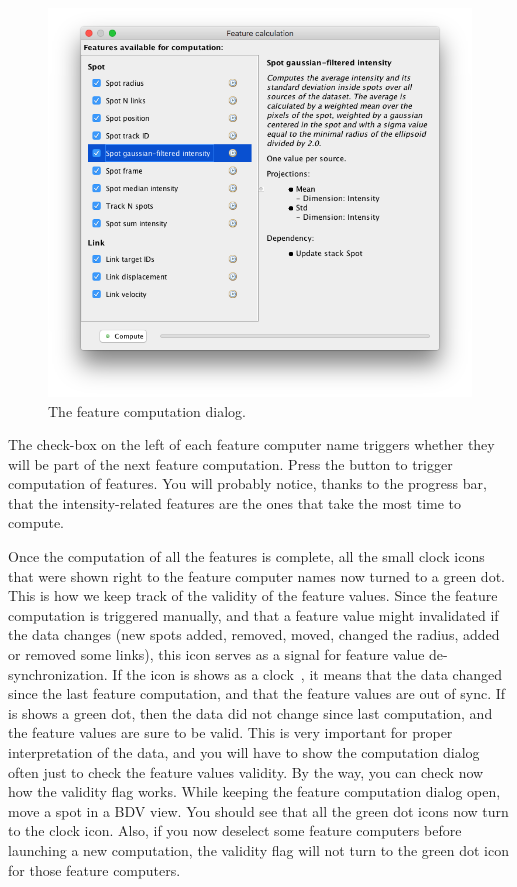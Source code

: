 \begin{figure}
    \centering
    \includegraphics[height=0.3\textheight]{figures/Mastodon_FeatureComputation_1.png}
    
    \caption{The feature computation dialog. }
    \label{fig:FeatureComputationDialog}
\end{figure}

The check-box on the left of each feature computer name triggers whether they will be part of the next feature computation.
Press the  button to trigger computation of features.
You will probably notice, thanks to the progress bar, that the intensity-related features are the ones that take the most time to compute. 

Once the computation of all the features is complete, all the small clock icons that were shown right to the feature computer names now turned to a green dot.
This is how we keep track of the validity of the feature values.
Since the feature computation is triggered manually, and that a feature value might invalidated if the data changes (new spots added, removed, moved, changed the radius, added or removed some links), this icon serves as a signal for feature value de-synchronization.     
If the icon is shows as a clock~, it means that the data changed since the last feature computation, and that the feature values are out of sync. 
If is shows a green dot, then the data did not change since last computation, and the feature values are sure to be valid. 
This is very important for proper interpretation of the data, and you will have to show the computation dialog often just to check the feature values validity. 
By the way, you can check now how the validity flag works. 
While keeping the feature computation dialog open, move a spot in a BDV view. 
You should see that all the green dot icons now turn to the clock icon.
Also, if you now deselect some feature computers before launching a new computation, the validity flag will not turn to the green dot icon for those feature computers.

